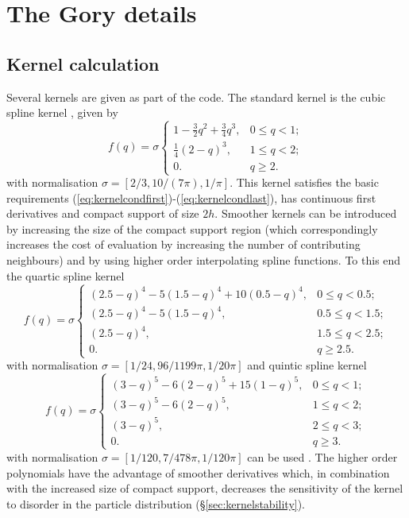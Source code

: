 \documentclass[a4paper,12pt]{article}
\begin{document}
\section{The Gory details}

\subsection{Kernel calculation}
 Several kernels are given as part of the code. The standard kernel is the cubic
 spline kernel \citep{ml85}, given by
\begin{equation}
f(q) = \sigma \left\{ \begin{array}{ll}
1 - \frac{3}{2}q^2 + \frac{3}{4}q^3, & 0 \le q < 1; \\
\frac{1}{4}(2-q)^3, & 1 \le q < 2; \\
0. & q \ge 2. \end{array} \right. \label{eq:cubicspline}
\end{equation}
with normalisation $\sigma = [2/3,10/(7\pi),1/\pi]$.
This kernel satisfies the basic requirements
(\ref{eq:kernelcondfirst})-(\ref{eq:kernelcondlast}), has continuous first
derivatives and compact support of size $2h$. Smoother kernels can be introduced
by increasing the size of the compact support region (which correspondingly
increases the cost of evaluation by increasing the number of contributing
neighbours) and by using higher order interpolating spline functions. To this end the
quartic spline kernel
\begin{equation}
f(q) = \sigma \left\{ \begin{array}{ll}
(2.5-q)^4 - 5(1.5-q)^4 + 10(0.5-q)^4, & 0 \le q < 0.5; \\
(2.5-q)^4 - 5(1.5-q)^4, & 0.5 \le q < 1.5; \\
(2.5-q)^4, & 1.5 \le q < 2.5; \\
0. & q \ge 2.5. \end{array} \right. \label{eq:quarticspline} 
\end{equation}
 with normalisation $\sigma = [1/24,96/1199\pi,1/20\pi]$ and quintic spline kernel
\begin{equation}
f(q) = \sigma \left\{ \begin{array}{ll}
(3-q)^5 - 6(2-q)^5 + 15(1-q)^5, & 0 \le q < 1; \\
(3-q)^5 - 6(2-q)^5, & 1 \le q < 2; \\
(3-q)^5, & 2 \le q < 3; \\
0. & q \ge 3. \end{array} \right. \label{eq:quinticspline}
\end{equation}
 with normalisation $\sigma = [1/120,7/478\pi,1/120\pi]$ can be used \citep[e.g.][]{morrisphd}. The higher order polynomials have the advantage of
smoother derivatives which, in combination with the increased size of compact
support, decreases the sensitivity of the kernel to disorder in the particle
distribution (\S\ref{sec:kernelstability}).
\end{document}

